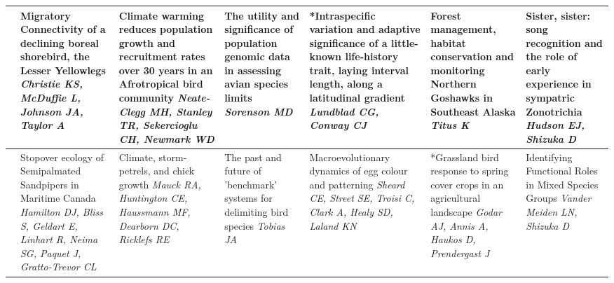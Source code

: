 \begin{tabular}{|x{0.75cm}|a{2.25cm}|x{2.25cm}|a{2.25cm}|x{2.25cm}|x{2.25cm}|a{2.25cm}|}
\hline
{}&Migratory Connectivity of a declining boreal shorebird, the Lesser Yellowlegs \newline \newline \textit{Christie KS, McDuffie L, Johnson JA, Taylor A} & Climate warming reduces population growth and recruitment rates over 30 years in an Afrotropical bird community \newline \newline \textit{Neate-Clegg MH, Stanley TR, Sekercioglu CH, Newmark WD} & The utility and significance of population genomic data in assessing avian species limits \newline \newline \textit{Sorenson MD} & *Intraspecific variation and adaptive significance of a little-known life-history trait, laying interval length, along a latitudinal gradient \newline \newline \textit{Lundblad CG, Conway CJ} & Forest management, habitat conservation and monitoring Northern Goshawks in Southeast Alaska \newline \newline \textit{Titus K} & Sister, sister: song recognition and the role of early experience in sympatric Zonotrichia \newline \newline \textit{Hudson EJ, Shizuka D}\\
\hline
{}&Stopover ecology of Semipalmated Sandpipers in Maritime Canada \newline \newline \textit{Hamilton DJ, Bliss S, Geldart E, Linhart R, Neima SG, Paquet J, Gratto-Trevor CL} & Climate, storm-petrels, and chick growth \newline \newline \textit{Mauck RA, Huntington CE, Haussmann MF, Dearborn DC, Ricklefs RE} & The past and future of 'benchmark' systems for delimiting bird species \newline \newline \textit{Tobias JA} & Macroevolutionary dynamics of egg colour and patterning \newline \newline \textit{Sheard CE, Street SE, Troisi C, Clark A, Healy SD, Laland KN} & *Grassland bird response to spring cover crops in an agricultural landscape \newline \newline \textit{Godar AJ, Annis A, Haukos D, Prendergast J} & Identifying Functional Roles in Mixed Species Groups \newline \newline \textit{Vander Meiden LN, Shizuka D}\\

\end{tabular}
